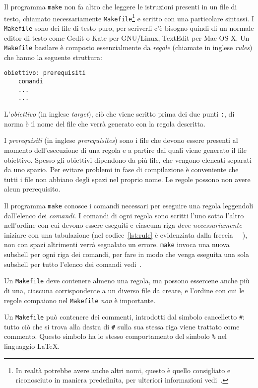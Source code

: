 Il programma \texttt{make} non fa altro che leggere le istruzioni presenti in un
file di testo, chiamato necessariamente
\texttt{Makefile}\footnote{In realtà potrebbe avere anche altri nomi, questo è
  quello consigliato e riconosciuto in maniera predefinita, per ulteriori
  informazioni vedi~\cite[pagina 12]{gnu:make}.}
e scritto con una particolare sintassi.  I \texttt{Makefile} sono dei file di
testo puro, per scriverli c'è bisogno quindi di un normale editor di testo come
Gedit o Kate per GNU/Linux, TextEdit per Mac OS X.  Un \texttt{Makefile}
basilare è composto essenzialmente da \emph{regole} (chiamate in inglese
\emph{rules}) che hanno la seguente struttura:
\begin{lstlisting}[showtabs=true,tab=\rightarrowfill,caption={Struttura di una
regola.},label=lst:rule]
obiettivo: prerequisiti
	comandi
	...
	...
\end{lstlisting}
L'\emph{obiettivo} (in inglese \emph{target}), ciò che viene scritto prima dei
due punti \texttt{:}, di norma è il nome del file che verrà generato con la
regola descritta.

I \emph{prerequisiti} (in inglese \emph{prerequisites}) sono i file che devono
essere presenti al momento dell'esecuzione di una regola e a partire dai quali
viene generato il file obiettivo.  Spesso gli obiettivi dipendono da più file,
che vengono elencati separati da uno spazio.  Per evitare problemi in fase di
compilazione è conveniente che tutti i file non abbiano degli spazi nel proprio
nome.  Le regole possono non avere alcun prerequisito.

Il programma \texttt{make} conosce i comandi necessari per eseguire una regola
leggendoli dall'elenco dei \emph{comandi}.  I comandi di ogni regola sono
scritti l'uno sotto l'altro nell'ordine con cui devono essere eseguiti e
ciascuna riga \emph{deve necessariamente} iniziare con una tabulazione (nel
codice~\ref{lst:rule} è evidenziata dalla freccia
\lstinline[showtabs=true,tab=\rightarrowfill]{	}), non con spazi altrimenti
verrà segnalato un errore.  \texttt{make} invoca una nuova subshell per ogni
riga dei comandi, per fare in modo che venga eseguita una sola subshell per
tutto l'elenco dei comandi vedi~\cite[pagina 44]{gnu:make}.

Un \texttt{Makefile} deve contenere almeno una regola, ma possono essercene
anche più di una, ciascuna corrispondente a un diverso file da creare, e
l'ordine con cui le regole compaiono nel \texttt{Makefile} \emph{non} è
importante.

Un \texttt{Makefile} può contenere dei commenti, introdotti dal simbolo
cancelletto \texttt{\#}: tutto ciò che si trova alla destra di \texttt{\#} sulla
sua stessa riga viene trattato come commento.  Questo simbolo ha lo stesso
comportamento del simbolo \texttt{\%} nel linguaggio \LaTeX{}.

